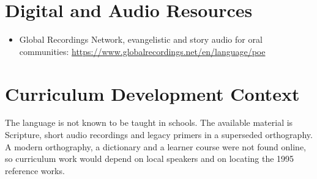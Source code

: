 \documentclass[12pt]{article}
\begin{document}
\section{Digital and Audio Resources}
\begin{itemize}
\item Global Recordings Network, evangelistic and story audio for oral communities: \url{https://www.globalrecordings.net/en/language/poe}
\end{itemize}

\section{Curriculum Development Context}
The language is not known to be taught in schools. The available material is Scripture, short audio recordings and legacy primers in a superseded orthography. A modern orthography, a dictionary and a learner course were not found online, so curriculum work would depend on local speakers and on locating the 1995 reference works.
\end{document}

